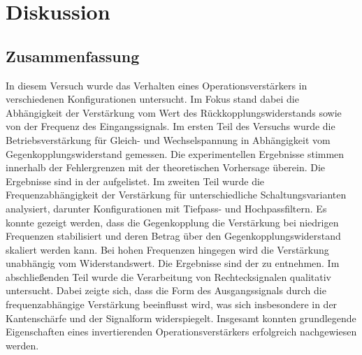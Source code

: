 \chapter{Diskussion}
\label{ch:Diskussion}

\section{Zusammenfassung}
\label{sec:Zusammenfassung}
In diesem Versuch wurde das Verhalten eines Operationsverstärkers in verschiedenen Konfigurationen untersucht. Im Fokus stand dabei die Abhängigkeit der Verstärkung vom Wert des Rückkopplungswiderstands sowie von der Frequenz des Eingangssignals. 
Im ersten Teil des Versuchs wurde die Betriebsverstärkung für Gleich- und Wechselspannung in Abhängigkeit vom Gegenkopplungswiderstand gemessen. Die experimentellen Ergebnisse stimmen innerhalb der Fehlergrenzen mit der theoretischen Vorhersage überein. Die Ergebnisse sind in der  aufgelistet.
Im zweiten Teil wurde die Frequenzabhängigkeit der Verstärkung für unterschiedliche Schaltungsvarianten analysiert, darunter Konfigurationen mit Tiefpass- und Hochpassfiltern. Es konnte gezeigt werden, dass die Gegenkopplung die Verstärkung bei niedrigen Frequenzen stabilisiert und deren Betrag über den Gegenkopplungswiderstand skaliert werden kann. Bei hohen Frequenzen hingegen wird die Verstärkung unabhängig vom Widerstandswert. Die Ergebnisse sind der  zu entnehmen.
Im abschließenden Teil wurde die Verarbeitung von Rechtecksignalen qualitativ untersucht. Dabei zeigte sich, dass die Form des Ausgangssignals durch die frequenzabhängige Verstärkung beeinflusst wird, was sich insbesondere in der Kantenschärfe und der Signalform widerspiegelt. Insgesamt konnten grundlegende Eigenschaften eines invertierenden Operationsverstärkers erfolgreich nachgewiesen werden.

